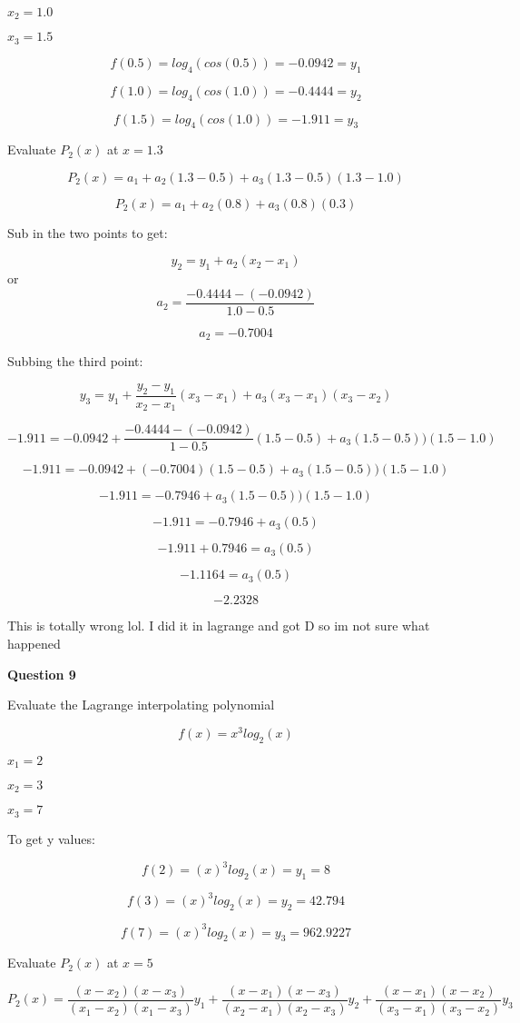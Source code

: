\documentclass{article}
\begin{document}
$ x_2 = 1.0$

$ x_3 = 1.5$

\[f(0.5) = log_4(cos(0.5)) = -0.0942 = y_1 \]

\[f(1.0) = log_4(cos(1.0)) = -0.4444 = y_2 \]

\[f(1.5) = log_4(cos(1.0)) = -1.911 = y_3 \]

Evaluate $P_2(x)$ at $x = 1.3$

\[P_2(x) = a_1 + a_2(1.3-0.5) + a_3(1.3 - 0.5)(1.3 - 1.0)\]

\[P_2(x) = a_1 + a_2(0.8) + a_3(0.8)(0.3)\]

Sub in the two points to get:

\[y_2 = y_1 + a_2(x_2 - x_1)\]
or
\[a_2 = \frac{-0.4444 - (-0.0942)}{1.0-0.5}\]

\[a_2 = -0.7004\]

Subbing the third point:

\[y_3 = y_1 + \frac{y_2-y_1}{x_2-x_1}(x_3-x_1) + a_3(x_3-x_1)(x_3-x_2)\]

\[-1.911 = -0.0942 + \frac{-0.4444-(-0.0942)}{1-0.5}(1.5-0.5) + a_3(1.5-0.5))(1.5-1.0)\]

\[-1.911 = -0.0942 + (-0.7004)(1.5-0.5) + a_3(1.5-0.5))(1.5-1.0)\]

\[-1.911 = -0.7946 + a_3(1.5-0.5))(1.5-1.0)\]

\[-1.911 = -0.7946 + a_3(0.5)\]

\[-1.911  + 0.7946 = a_3(0.5)\]

\[-1.1164 = a_3(0.5)\]

\[-2.2328\]

This is totally wrong lol. I did it in lagrange and got D so im not sure what happened


\textbf{Question 9}

Evaluate the Lagrange interpolating polynomial

\[f(x) = x^3log_2(x)\]

$x_1 = 2$

$ x_2 = 3$

$ x_3 = 7$

To get y values:

\[f(2) =  (x)^3log_2(x) = y_1 = 8\]

\[f(3) =  (x)^3log_2(x) = y_2 = 42.794 \]

\[f(7) =  (x)^3log_2(x) = y_3 = 962.9227 \]

Evaluate $P_2(x)$ at $x = 5$

\[P_2(x) = \frac{(x-x_2)(x-x_3)}{(x_1 - x_2)(x_1 - x_3)}y_1 +  \frac{(x-x_1)(x-x_3)}{(x_2 - x_1)(x_2 - x_3)}y_2 + \frac{(x-x_1)(x-x_2)}{(x_3 - x_1)(x_3 - x_2)}y_3\]
\end{document}
